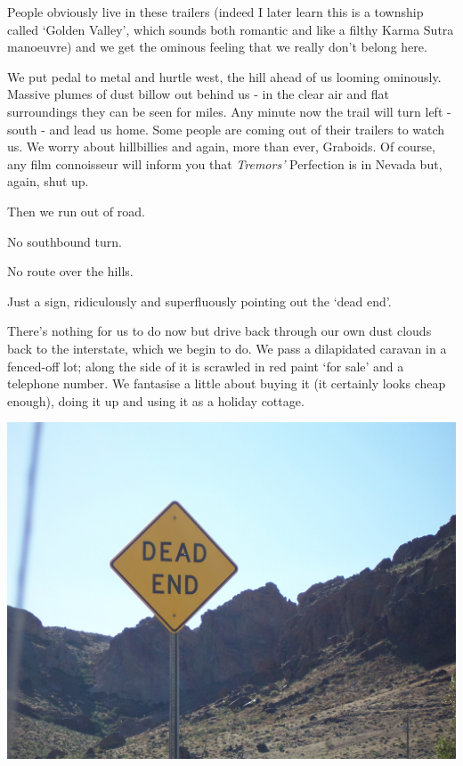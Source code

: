 \documentclass[a5paper,titlepage,11pt]{book}
\begin{document}
People obviously live in these trailers (indeed I later learn this is a township called `Golden Valley', which sounds both romantic and like a filthy Karma Sutra manoeuvre) and we get the ominous feeling that we really don't belong here.

We put pedal to metal and hurtle west, the hill ahead of us looming ominously.  Massive plumes of dust billow out behind us - in the clear air and flat surroundings they can be seen for miles.  Any minute now the trail will turn left - south - and lead us home.  Some people are coming out of their trailers to watch us.  We worry about hillbillies and again, more than ever, Graboids.  Of course, any film connoisseur will inform you that \emph{Tremors'} Perfection is in Nevada but, again, shut up.

Then we run out of road.

No southbound turn.

No route over the hills.

Just a sign, ridiculously and superfluously pointing out the `dead end'.

There's nothing for us to do now but drive back through our own dust clouds back to the interstate, which we begin to do.  We pass a dilapidated caravan in a fenced-off lot; along the side of it is scrawled in red paint `for sale' and a telephone number.  We fantasise a little about buying it (it certainly looks cheap enough), doing it up and using it as a holiday cottage.

\begin{center}\includegraphics[width=\textwidth]{gfx/100_1536}\end{center}
\end{document}
